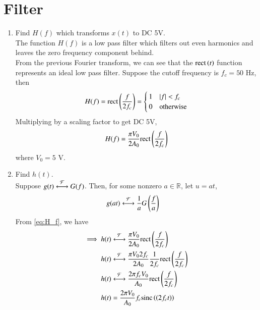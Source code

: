 \documentclass[journal,12pt,twocolumn]{IEEEtran}
\renewcommand\thesection{\arabic{section}}
\begin{document}
\section{Filter}
\begin{enumerate}[label=\thesection.\arabic*
,ref=\thesection.\theenumi]
\item Find $H(f)$ which transforms $x(t)$ to DC 5V. \\
\solution The function $H(f)$ is a low pass filter which filters out
even harmonics and leaves the zero frequency component behind. \\ From the previous Fourier transform, we can see that the $\text{rect}\left(t\right)$ function represents an ideal low pass filter. Suppose the cutoff frequency is $f_c = 50$ Hz, then
\begin{align}
	H(f) = \text{rect}\left(\frac{f}{2f_c}\right) =
	\begin{cases}
		1 & \left\vert f\right\vert < f_c \\
		0 & \textrm{otherwise}
	\end{cases}
\end{align}
Multiplying by a scaling factor to get DC 5V,
\begin{align}
	H(f) = \frac{\pi V_0}{2A_0}\text{rect}\left(\frac{f}{2f_c}\right)
	\label{eq:H_f}
\end{align}
where $V_0 = 5$ V.


\item Find $h(t)$. \\
\solution Suppose $g(t)\overset{\mathcal{F}}{ \longleftrightarrow}G(f)$. Then, for some
nonzero $a \in \mathbb{R}$, let $u=at$,
\begin{align}
	g(at)&\overset{\mathcal{F}}{ \longleftrightarrow}\frac{1}{a}G\left(\frac{f}{a}\right)
\end{align}
From \eqref{eq:H_f}, we have 
\begin{align}
	\implies h(t)&\overset{\mathcal{F}}{ \longleftrightarrow} \frac{\pi V_0}{2A_0}\text{rect}\left(\frac{f}{2f_c}\right)\\
	h(t)&\overset{\mathcal{F}}{ \longleftrightarrow} \frac{\pi V_0 2f_c}{2A_0}  \frac{1}{2f_c}\text{rect}\left(\frac{f}{2f_c}\right)\\
	h(t)&\overset{\mathcal{F}}{ \longleftrightarrow} \frac{2 \pi f_c V_0}{A_0}\text{rect}\left(\frac{f}{2f_c}\right)\\
	h(t) &= \frac{2\pi V_0}{A_0}f_c\text{sinc}\left(\left(2f_ct\right)\right)
\end{align}



\end{enumerate}
\end{document}
